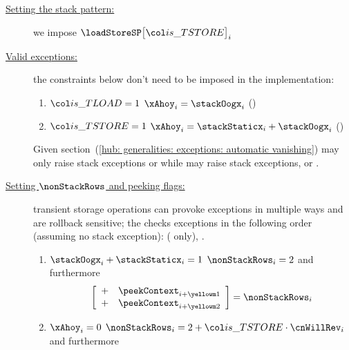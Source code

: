 \begin{center}
\end{center}

\begin{description}
	\item[\underline{Setting the stack pattern:}]
		we impose $\loadStoreSP\big[ \locIsTstore \big]_{i}$
	\item[\underline{Valid exceptions:}]
		the constraints below don't need to be imposed in the implementation:
		\begin{enumerate}
			\item \If $\locIsTload  = 1$ \Then $\xAhoy_{i} = \stackOogx_{i}$ \quad (\trash)
			\item \If $\locIsTstore = 1$ \Then $\xAhoy_{i} = \stackStaticx_{i} + \stackOogx_{i}$ \quad (\trash)
		\end{enumerate}
		\saNote{}
		Given section~(\ref{hub: generalities: exceptions: automatic vanishing})
		 may only raise stack exceptions or \oogxSH{}
		while  may raise stack exceptions, \staticxSH{} or \oogxSH{}.
	\item[\underline{Setting $\nonStackRows$ and peeking flags:}]
		\label{hub: instruction handling: storage: non stack rows and peeking flags}
		transient storage operations can provoke exceptions in multiple ways and are rollback sensitive;
		the \zkEvm{} checks exceptions in the following order (assuming no stack exception):
		\staticxSH{} ( only),
		\oogxSH{}.
		\begin{enumerate}
			\item \If $\stackOogx _{i} + \stackStaticx _{i} = 1$ \Then $\nonStackRows_{i} = 2$ and furthermore
				\[
					\left[ \begin{array}{cr}
						+ & \peekContext _{i + \locTransientCurrContextRow        } \\
						+ & \peekContext _{i + \locTransientPrntContextRowStaticx } \\
					\end{array} \right]
					=
					\nonStackRows _{i}
				\]
			\item \If $\xAhoy_{i} = 0$ \Then $\nonStackRows_{i} = 2 + \locIsTstore \cdot \cnWillRev_{i}$ and furthermore

\end{enumerate}
\end{description}
